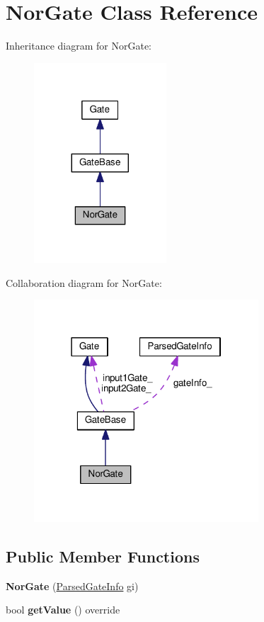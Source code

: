 \hypertarget{classNorGate}{}\section{Nor\+Gate Class Reference}
\label{classNorGate}


Inheritance diagram for Nor\+Gate\+:
\nopagebreak
\begin{figure}[H]
\begin{center}
\leavevmode
\includegraphics[width=140pt]{classNorGate__inherit__graph}
\end{center}
\end{figure}


Collaboration diagram for Nor\+Gate\+:
\nopagebreak
\begin{figure}[H]
\begin{center}
\leavevmode
\includegraphics[width=238pt]{classNorGate__coll__graph}
\end{center}
\end{figure}
\subsection*{Public Member Functions}
\begin{DoxyCompactItemize}
\item 
{\bfseries Nor\+Gate} (\hyperlink{structParsedGateInfo}{Parsed\+Gate\+Info} gi)\hypertarget{classNorGate_a73cfc820987baef690bfb8e17881c4d6}{}\label{classNorGate_a73cfc820987baef690bfb8e17881c4d6}

\item 
bool {\bfseries get\+Value} () override\hypertarget{classNorGate_ab6f9d148efa2886aee68e0d08eedc439}{}\label{classNorGate_ab6f9d148efa2886aee68e0d08eedc439}

\end{DoxyCompactItemize}
